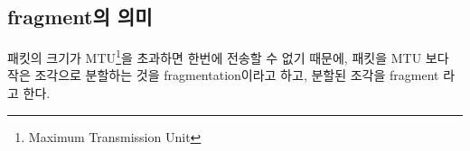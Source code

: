 \subsection{fragment의 의미}
패킷의 크기가 MTU\footnote{Maximum Transmission Unit}을 초과하면 한번에 전송할 수 없기 때문에, 패킷을 MTU 보다 작은 조각으로 분할하는 것을 fragmentation이라고 하고, 분할된 조각을 fragment 라고 한다. 